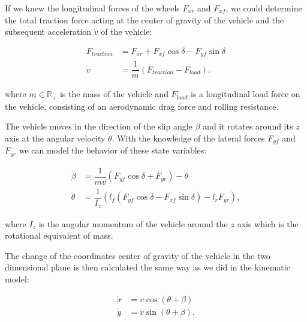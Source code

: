 If we knew the longitudinal forces of the wheels $F_{xr}$ and $F_{xf}$, we could determine the total traction force acting at the center of gravity of the vehicle and the subsequent acceleration $\dot{v}$ of the vehicle:

\begin{equation*}
\begin{aligned}
F_{traction}&=F_{xr}+F_{xf}\cos\delta-F_{yf}\sin\delta \\
\dot{v}&=\dfrac{1}{m}\left(F_{traction}-F_{load}\right).
\end{aligned}
\end{equation*}

where $m\in\mathbb{R}_+$ is the mass of the vehicle and $F_{load}$ is a longitudinal load force on the vehicle, consisting of an aerodynamic drag force and rolling resistance.

The vehicle moves in the direction of the slip angle $\beta$ and it rotates around its $z$ axis at the angular velocity $\dot{\theta}$. With the knowledge of the lateral forces $F_{yf}$ and $F_{yr}$ we can model the behavior of these state variables:

\begin{equation*}
\begin{aligned}
\dot{\beta}&=\dfrac{1}{mv}\left(F_{yf}\cos\delta+F_{yr}\right)-\dot{\theta} \\
\ddot{\theta}&=\dfrac{1}{I_z}\left(l_f \left(F_{yf}\cos\delta - F_{xf}\sin\delta \right) - l_r F_{yr}\right),
\end{aligned}
\end{equation*}

where $I_z$ is the angular momentum of the vehicle around the $z$ axis which is the rotational equivalent of mass.

The change of the coordinates center of gravity of the vehicle in the two dimensional plane is then calculated the same way as we did in the kinematic model:

\begin{equation*}
\begin{aligned}
\dot{x}&=v\cos\left(\theta + \beta\right) \\
\dot{y}&=v\sin\left(\theta + \beta\right).
\end{aligned}
\end{equation*}

